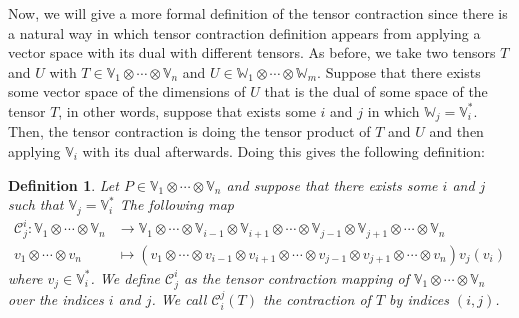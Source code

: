 \documentclass[11pt,a4paper,openright,oneside]{book}
\numberwithin{equation}{section}
\newtheorem{defn0}{Definition}[chapter]
\newenvironment{definition}{ \begin{defn0}}{\end{defn0}}
\begin{document}

Now, we will give a more formal definition of the tensor contraction since there is a natural way in which tensor contraction definition
appears from applying a vector space with its dual with different tensors. As before, we take two tensors $T$ and $U$ with
$T \in \mathbb{V}_1 \otimes \cdots \otimes \mathbb{V}_n$ and $U \in \mathbb{W}_1 \otimes \cdots \otimes \mathbb{W}_m$. Suppose that there exists
some vector space of the dimensions of $U$ that is the dual of some space of the tensor $T$, in other words, suppose that exists
some $i$ and $j$ in which $\mathbb{W}_j = \mathbb{V}_i^*$. Then, the tensor contraction is doing the tensor product of $T$ and $U$ and then applying
$\mathbb{V}_i$ with its dual afterwards. Doing this gives the following definition:

\begin{definition}
    Let $P \in \mathbb{V}_1 \otimes \cdots \otimes \mathbb{V}_n$
    and suppose that there exists some $i$ and $j$ such
    that $\mathbb{V}_j = \mathbb{V}_i^*$ The following map
    $$
    \begin{align}
    \mathcal{C}_j^i: 
    \mathbb{V}_1 \otimes \cdots \otimes \mathbb{V}_n &\longrightarrow 
    \mathbb{V}_1 \otimes \cdots \otimes \mathbb{V}_{i-1} \otimes \mathbb{V}_{i+1} \otimes \cdots \otimes \mathbb{V}_{j-1} \otimes \mathbb{V}_{j+1} \otimes \cdots \otimes \mathbb{V}_n \\
 v_1 \otimes \cdots \otimes v_n
                                                     &\longmapsto \left( v_1 \otimes \cdots \otimes v_{i-1} \otimes v_{i+1} \otimes \cdots \otimes v_{j-1} \otimes v_{j+1} \otimes \cdots \otimes v_n \right) v_j(v_i)
\end{align}
$$
where $v_j \in \mathbb{V}_i^*$. We define 
$\mathcal{C}_j^i$ as the tensor contraction mapping of $\mathbb{V}_1 \otimes \cdots \otimes \mathbb{V}_n$ over the indices $i$ and $j$.
We call $\mathcal{C}_i^j(T)$ the contraction of $T$ by indices $(i,j)$.
\label{def:contraction}
\end{definition}
\end{document}

